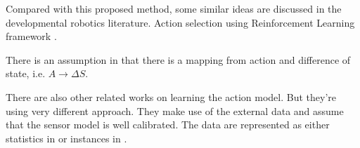 \documentclass[10pt]{article}
\begin{document}
Compared with this proposed method, some similar ideas are discussed
in the developmental robotics literature. Action selection using
Reinforcement Learning framework \cite{oudeyer2006discovering,
schmidhuber2006developmental}.

There is an assumption in \cite{CSJ06} that there is a mapping from
action and difference of state, i.e. $A \rightarrow \Delta S$.

There are also other related works on learning the action model. But
they're using very different approach. They make use of the external
data and assume that the sensor model is well calibrated. The data are
represented as either statistics in \cite{And_learningand} or
instances in \cite{LNAI2007-ahmadi}.




\end{document}
